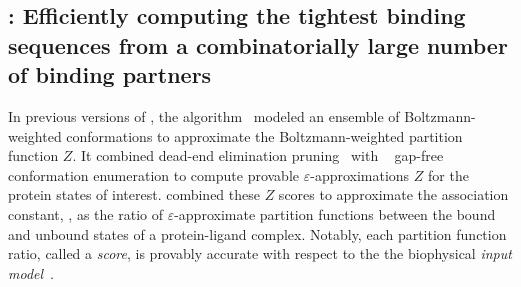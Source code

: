 \def\multisequencebound{MS\xspace}
\def\msbound{\multisequencebound}


\newcommand{\cut}[1]{}

\subsection{\bbks: Efficiently computing the tightest binding sequences from a combinatorially large number of binding partners}
\cut{Although many GMEC-based designs predict sequences which fold and even bind the desired target, proteins do not exist in nature as a single static structure, but instead as thermodynamic ensemble of structures. Protein design algorithms that optimize binding affinity search for sequences whose thermodynamic ensemble energetically favor the desired bound or unbound states over other undesirable states. In doing so, these algorithms search for sequences whose conformational ensemble may contain multiple low-energy conformations in the desired state. Algorithms whose input model accounts for the ensemble-nature of proteins more accurately represent protein flexibility, and can identify sequences with multiple low-energy conformations which GMEC-based algorithms do not model, and would thus overlook.}
In previous versions of \osprey, the \ks algorithm~\cite{K*} modeled an ensemble of Boltzmann-weighted conformations to approximate the Boltzmann-weighted partition function $Z$. It combined dead-end elimination pruning~\cite{DEE} with \as~\cite{DEE,A*} gap-free conformation enumeration to compute provable $\varepsilon$-approximations $Z$ for the protein states of interest. \ks combined these $Z$ scores to approximate the association constant, \ka, as the ratio of $\varepsilon$-approximate partition functions between the bound and unbound states of a protein-ligand complex. Notably, each partition function ratio, called a \ks \emph{score}, is provably accurate with respect to the the biophysical \emph{input model}~\cite{K*,minDEE,iMinDEE}. 
%
\cut{The input model defines the set of allowed amino acid mutations (i.e.~the \emph{sequence space}), structural search space (i.e.~the input structures, and allowed protein flexibility), the optimization objective (e.g.~design for binding affinity), and the energy function~\cite{}.} 
%
